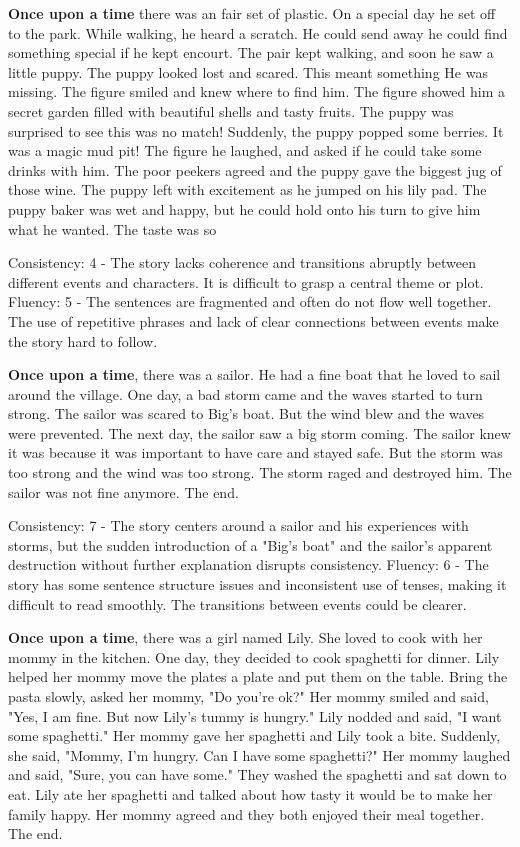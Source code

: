 \documentclass{article}
\begin{document}
\textbf{Once upon a time} there was an fair set of plastic. On a special day he set off to the park. While walking, he heard a scratch. He could send away he could find something special if he kept encourt. The pair kept walking, and soon he saw a little puppy. The puppy looked lost and scared. This meant something He was missing. The figure smiled and knew where to find him. The figure showed him a secret garden filled with beautiful shells and tasty fruits. The puppy was surprised to see this was no match! Suddenly, the puppy popped some berries. It was a magic mud pit! The figure he laughed, and asked if he could take some drinks with him. The poor peekers agreed and the puppy gave the biggest jug of those wine. The puppy left with excitement as he jumped on his lily pad. The puppy baker was wet and happy, but he could hold onto his turn to give him what he wanted. The taste was so

Consistency: 4 - The story lacks coherence and transitions abruptly between different events and characters. It is difficult to grasp a central theme or plot.
Fluency: 5 - The sentences are fragmented and often do not flow well together. The use of repetitive phrases and lack of clear connections between events make the story hard to follow.

\textbf{Once upon a time}, there was a sailor. He had a fine boat that he loved to sail around the village. One day, a bad storm came and the waves started to turn strong. The sailor was scared to Big's boat. But the wind blew and the waves were prevented. The next day, the sailor saw a big storm coming. The sailor knew it was because it was important to have care and stayed safe. But the storm was too strong and the wind was too strong. The storm raged and destroyed him. The sailor was not fine anymore. The end.

Consistency: 7 - The story centers around a sailor and his experiences with storms, but the sudden introduction of a "Big's boat" and the sailor's apparent destruction without further explanation disrupts consistency.
Fluency: 6 - The story has some sentence structure issues and inconsistent use of tenses, making it difficult to read smoothly. The transitions between events could be clearer.

\textbf{Once upon a time}, there was a girl named Lily. She loved to cook with her mommy in the kitchen. One day, they decided to cook spaghetti for dinner. Lily helped her mommy move the plates a plate and put them on the table. Bring the pasta slowly, asked her mommy, "Do you're ok?" Her mommy smiled and said, "Yes, I am fine. But now Lily's tummy is hungry." Lily nodded and said, "I want some spaghetti." Her mommy gave her spaghetti and Lily took a bite. Suddenly, she said, "Mommy, I'm hungry. Can I have some spaghetti?" Her mommy laughed and said, "Sure, you can have some." They washed the spaghetti and sat down to eat. Lily ate her spaghetti and talked about how tasty it would be to make her family happy. Her mommy agreed and they both enjoyed their meal together. The end.
\end{document}
